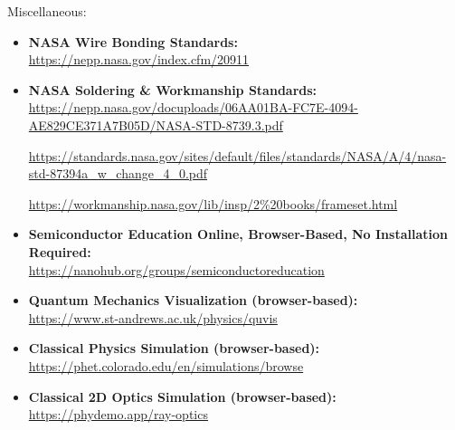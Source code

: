 \newpage

\begin{flushleft}
\large Miscellaneous:
\end{flushleft}

\normalsize\begin{itemize}

  \item\textbf{NASA Wire Bonding Standards:}\\
\url{https://nepp.nasa.gov/index.cfm/20911}

  \item\textbf{NASA Soldering \& Workmanship Standards:}\\
\url{https://nepp.nasa.gov/docuploads/06AA01BA-FC7E-4094-AE829CE371A7B05D/NASA-STD-8739.3.pdf}

\url{https://standards.nasa.gov/sites/default/files/standards/NASA/A/4/nasa-std-87394a_w_change_4_0.pdf}

\url{https://workmanship.nasa.gov/lib/insp/2%20books/frameset.html}

  \item\textbf{Semiconductor Education Online, Browser-Based, No Installation Required:}\\
\url{https://nanohub.org/groups/semiconductoreducation}

  \item\textbf{Quantum Mechanics Visualization (browser-based):}\\
\url{https://www.st-andrews.ac.uk/physics/quvis}

  \item\textbf{Classical Physics Simulation (browser-based):}\\
\url{https://phet.colorado.edu/en/simulations/browse}

  \item\textbf{Classical 2D Optics Simulation (browser-based):}\\
\url{https://phydemo.app/ray-optics}


\end{itemize}
